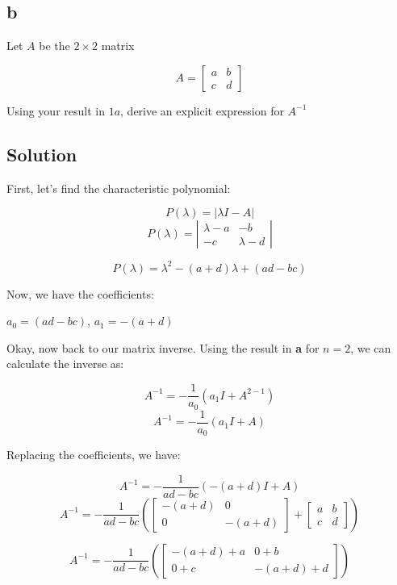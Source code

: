 \documentclass[10pt,a4paper]{article}
\begin{document}
\subsection*{b}
Let $A$ be the $2 \times 2$ matrix

\[ A = 
   \begin{bmatrix}
   a & b \\
   c & d
   \end{bmatrix} 
\]

Using your result in $1a$, derive an explicit expression for $A^{-1}$

\subsection*{Solution}
First, let's find the characteristic polynomial:

\[P(\lambda) = 
\left | 
\lambda I - A
\right | 
\]
\[P(\lambda) = 
\left | 
\begin{matrix}
\lambda -a & -b \\
-c & \lambda - d
\end{matrix}
\right | 
\]

\[P(\lambda) = \lambda^{2} - (a+d)\lambda + (ad-bc) \]

Now, we have the coefficients:

$a_{0} = (ad-bc)$, \hspace*{1cm} $a_{1} = -(a+d)$

Okay, now back to our matrix inverse. Using the result in \textbf{a} for $n = 2$, we can calculate the inverse as:

\[ A^{-1} = - \dfrac{1}{a_{0}}\left ( a_{1}I +  A^{2-1} \right ) \]
\[ A^{-1} = - \dfrac{1}{a_{0}}\left ( a_{1}I + A \right ) \]

Replacing the coefficients, we have:

\[ A^{-1} = - \dfrac{1}{ad-bc}\left ( -(a+d)I + A \right ) \]
\[ A^{-1} = - \dfrac{1}{ad-bc}\left ( 
\begin{bmatrix}
-(a+d) & 0 \\
0 & -(a+d)
\end{bmatrix}
 +  
 \begin{bmatrix}
a & b \\
c & d
\end{bmatrix}
\right ) \]

\[ A^{-1} = - \dfrac{1}{ad-bc}\left ( 
\begin{bmatrix}
-(a+d) + a & 0+b \\
 0+c & -(a+d)+d
\end{bmatrix}
\right ) \]
\end{document}

